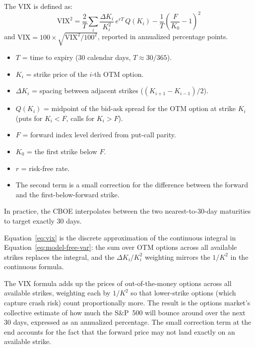 \begin{definition}
\label{def:vix}
The VIX is defined as:
\begin{equation}
  \text{VIX}^2 = \frac{2}{T}\sum_i \frac{\Delta K_i}{K_i^2}\,e^{rT}\, Q(K_i)
  - \frac{1}{T}\left(\frac{F}{K_0} - 1\right)^2
  \label{eq:vix}
\end{equation}
and $\text{VIX} = 100 \times \sqrt{\text{VIX}^2/100^2}$, reported in annualized percentage points.
\begin{itemize}[nosep]
  \item $T$ = time to expiry (30 calendar days, $T \approx 30/365$).
  \item $K_i$ = strike price of the $i$-th OTM option.
  \item $\Delta K_i$ = spacing between adjacent strikes ($(K_{i+1} - K_{i-1})/2$).
  \item $Q(K_i)$ = midpoint of the bid-ask spread for the OTM option at strike $K_i$ (puts for $K_i < F$, calls for $K_i > F$).
  \item $F$ = forward index level derived from put-call parity.
  \item $K_0$ = the first strike below $F$.
  \item $r$ = risk-free rate.
  \item The second term is a small correction for the difference between the forward and the first-below-forward strike.
\end{itemize}
In practice, the CBOE interpolates between the two nearest-to-30-day maturities to target exactly 30 days.
\end{definition}

Equation~\eqref{eq:vix} is the discrete approximation of the continuous integral in Equation~\eqref{eq:model-free-var}: the sum over OTM options across all available strikes replaces the integral, and the $\Delta K_i / K_i^2$ weighting mirrors the $1/K^2$ in the continuous formula.

\begin{intuition}
The VIX formula adds up the prices of out-of-the-money options across all available strikes, weighting each by $1/K^2$ so that lower-strike options (which capture crash risk) count proportionally more.
The result is the options market's collective estimate of how much the S\&P~500 will bounce around over the next 30 days, expressed as an annualized percentage.
The small correction term at the end accounts for the fact that the forward price may not land exactly on an available strike.
\end{intuition}

